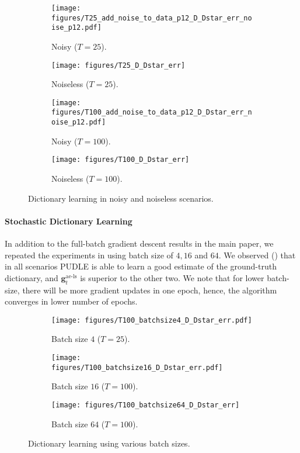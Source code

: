 \documentclass[10pt]{article} %
\newcommand{\g}{{\bm g}}
\begin{document}
%
\begin{figure}[h]
	\centering
	\begin{subfigure}[t]{0.24\linewidth}
	\centering
	\texttt{[image: figures/T25\_add\_noise\_to\_data\_p12\_D\_Dstar\_err\_noise\_p12.pdf]}
	  \caption{Noisy ($T=25$).}
  	\label{fig:dl_25_noisy}
	\end{subfigure}
	\begin{subfigure}[t]{0.24\linewidth}
	\centering
	\texttt{[image: figures/T25\_D\_Dstar\_err]}
	  \caption{Noiseless ($T=25$).}
  	\label{fig:dl_25_a}
	\end{subfigure}
	\begin{subfigure}[t]{0.24\linewidth}
	\centering
	\texttt{[image: figures/T100\_add\_noise\_to\_data\_p12\_D\_Dstar\_err\_noise\_p12.pdf]}
	  \caption{Noisy ($T=100$).}
  	\label{fig:dl_100_noisy}
	\end{subfigure}
	\begin{subfigure}[t]{0.24\linewidth}
	\centering
	\texttt{[image: figures/T100\_D\_Dstar\_err]}
	  \caption{Noiseless ($T=100$).}
  	\label{fig:dl_100_a}
	\end{subfigure}
    \caption{Dictionary learning in noisy and noiseless scenarios.}
	\label{fig:dl_noisy}
	\vspace{-4mm}
\end{figure}
%
\paragraph{Stochastic Dictionary Learning} In addition to the full-batch gradient descent results in the main paper, we repeated the experiments in  using batch size of $4, 16$ and $64$. We observed () that in all scenarios PUDLE is able to learn a good estimate of the ground-truth dictionary, and $\g_t^{\text{ae-ls}}$ is superior to the other two. We note that for lower batch-size, there will be more gradient updates in one epoch, hence, the algorithm converges in lower number of epochs.
\begin{figure}[h]
	\centering
	\begin{subfigure}[t]{0.28\linewidth}
	\centering
	\texttt{[image: figures/T100\_batchsize4\_D\_Dstar\_err.pdf]}
	  \caption{Batch size $4$ ($T=25$).}
  	\label{fig:dl_100_batch4}
	\end{subfigure}
	\begin{subfigure}[t]{0.28\linewidth}
	\centering
	\texttt{[image: figures/T100\_batchsize16\_D\_Dstar\_err.pdf]}
	  \caption{Batch size $16$ ($T=100$).}
  	\label{fig:dl_100_batch16}
	\end{subfigure}
	\begin{subfigure}[t]{0.28\linewidth}
	\centering
	\texttt{[image: figures/T100\_batchsize64\_D\_Dstar\_err]}
	  \caption{Batch size $64$ ($T=100$).}
  	\label{fig:dl_100_batch64}
	\end{subfigure}
    \caption{Dictionary learning using various batch sizes.}
	\label{fig:dl_batch}
	\vspace{-4mm}
\end{figure}
%
\end{document}
